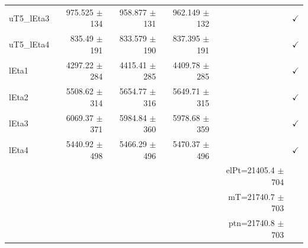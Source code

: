 \begin{table}[htbp]
\begin{tabular}{lrrrrr}
uT5\_lEta3 & 975.525 $\pm$ 134 & 958.877 $\pm$ 131 & 962.149 $\pm$ 132 &  & $\checkmark$ \\
uT5\_lEta4 & 835.49 $\pm$ 191 & 833.579 $\pm$ 190 & 837.395 $\pm$ 191 &  & $\checkmark$ \\
\hline
lEta1 & 4297.22 $\pm$ 284 & 4415.41 $\pm$ 285 & 4409.78 $\pm$ 285 &  & $\checkmark$ \\
lEta2 & 5508.62 $\pm$ 314 & 5654.77 $\pm$ 316 & 5649.71 $\pm$ 315 &  & $\checkmark$ \\
lEta3 & 6069.37 $\pm$ 371 & 5984.84 $\pm$ 360 & 5978.68 $\pm$ 359 &  & $\checkmark$ \\
lEta4 & 5440.92 $\pm$ 498 & 5466.29 $\pm$ 496 & 5470.37 $\pm$ 496 &  & $\checkmark$ \\
\hline
 &  &  &  & elPt=21405.4 $\pm$ 704 &  \\
 &  &  &  & mT=21740.7 $\pm$ 703 &  \\
 &  &  &  & ptn=21740.8 $\pm$ 703 &  \\
\hline
\end{tabular}
\end{table}